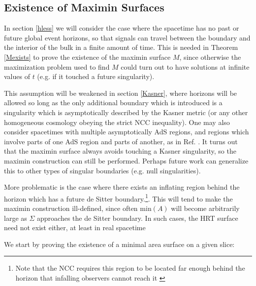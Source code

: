 \documentclass[12pt]{article}
\begin{document}
\subsection{Existence of Maximin Surfaces}\label{exist}

In section \ref{hless} we will consider the case where the spacetime has no past or future global event horizons, so that signals can travel between the boundary and the interior of the bulk in a finite amount of time.  This is needed in Theorem \ref{Mexists} to prove the existence of the maximin surface $M$, since otherwise the maximization problem used to find $M$ could turn out to have solutions at infinite values of $t$ (e.g. if it touched a future singularity).  

This assumption will be weakened in section \ref{Kasner}, where horizons will be allowed so long as the only additional boundary which is introduced is a singularity which is asymptotically described by the Kasner metric (or any other homogeneous cosmology obeying the strict NCC inequality).  One may also consider spacetimes with multiple asymptotically AdS regions, and regions which involve parts of one AdS region and parts of another, as in Ref. \cite{HM13}.  It turns out that the maximin surface always avoids touching a Kasner singularity, so the maximin construction can still be performed.  Perhaps future work can generalize this to other types of singular boundaries (e.g. null singularities).

More problematic is the case where there exists an inflating region behind the horizon which has a future de Sitter boundary.\footnote{Note that the NCC requires this region to be located far enough behind the horizon that infalling observers cannot reach it \cite{FG87}}.  This will tend to make the maximin construction ill-defined, since often $\mathrm{min}(A)$ will become arbitrarily large as $\Sigma$ approaches the de Sitter boundary.  In such cases, the HRT surface need not exist either, at least in real spacetime \cite{FM14}


We start by proving the existence of a minimal area surface on a given slice:
\end{document}
